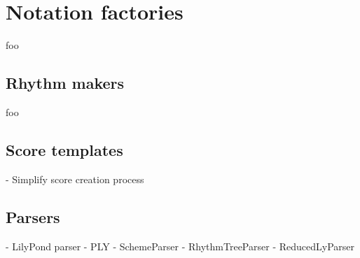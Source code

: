 \section{Notation factories}

foo

\subsection{Rhythm makers}

foo

\subsection{Score templates}
\label{ssec:score-templates}

\begin{markdown}
-   Simplify score creation process
\end{markdown}

\subsection{Parsers}

\begin{markdown}
-   LilyPond parser
-   PLY
-   SchemeParser
-   RhythmTreeParser
-   ReducedLyParser
\end{markdown}
